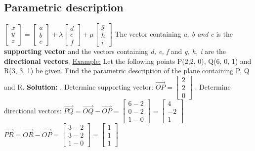 \subsection{Parametric description}
$\begin{bmatrix} x \\ y \\ z\end{bmatrix} = \begin{bmatrix} a \\ b \\c\end{bmatrix} + \lambda \begin{bmatrix} d \\ e \\ f \end{bmatrix} + \mu \begin{bmatrix} g \\ h \\ i\end{bmatrix}$
\newline
The vector containing \textit{a, b and c} is the \textbf{supporting vector} and the vectors containing \textit{d, e, f} and \textit{g, h, i} are the \textbf{directional vectors}.
\newline
\underline{Example:}
\newline
Let the following points P(2,2, 0), Q(6, 0, 1) and R(3, 3, 1) be given. Find the parametric description of the plane containing P, Q and R.
\newline
\textbf{Solution:}
. Determine supporting vector: $\vec{OP} = \begin{bmatrix} 2 \\ 2 \\ 0 \end{bmatrix}$
. Determine directional vectors: 
\newline
$\vec{PQ} = \vec{OQ} - \vec{OP} = \begin{bmatrix} 6 - 2 \\ 0 - 2 \\ 1 - 0 \end{bmatrix} = \begin{bmatrix} 4 \\ -2 \\ 1 \end{bmatrix}$
\newline
$\vec{PR} = \vec{OR} - \vec{OP} = \begin{bmatrix} 3 - 2 \\ 3 - 2 \\ 1 - 0 \end{bmatrix} = \begin{bmatrix} 1 \\ 1 \\ 1 \end{bmatrix}$
